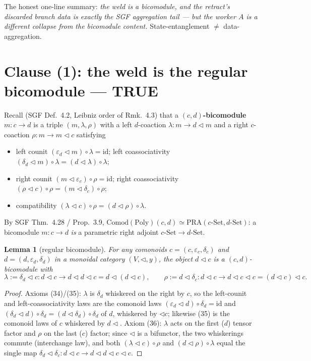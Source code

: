 \documentclass[11pt]{article}
\newtheorem{lemma}[theorem]{Lemma}
\theoremstyle{definition}
\newcommand{\Set}{\mathrm{Set}}
\newcommand{\Poly}{\mathrm{Poly}}
\newcommand{\Comod}{\mathrm{Comod}}
\newcommand{\PRA}{\mathrm{PRA}}
\newcommand{\id}{\mathrm{id}}
\newcommand{\comp}{\triangleleft}
\begin{document}
The honest one-line summary: \emph{the weld is a bicomodule, and the retract's discarded
branch data is exactly the SGF aggregation tail --- but the worker $A$ is a different
collapse from the bicomodule content.} State-entanglement $\neq$ data-aggregation.

\section{Clause (1): the weld is the regular bicomodule --- TRUE}\label{sec:clause1}

Recall (SGF Def.~4.2, Leibniz order of Rmk.~4.3) that a \textbf{$(c,d)$-bicomodule}
$m\colon c\to d$ is a triple $(m,\lambda,\rho)$ with a left $d$-coaction
$\lambda\colon m\to d\comp m$ and a right $c$-coaction $\rho\colon m\to m\comp c$ satisfying
\begin{itemize}
\item[(34)] left counit $(\varepsilon_{d}\comp m)\circ\lambda=\id$; left coassociativity
$(\delta_{d}\comp m)\circ\lambda=(d\comp\lambda)\circ\lambda$;
\item[(35)] right counit $(m\comp\varepsilon_{c})\circ\rho=\id$; right coassociativity
$(\rho\comp c)\circ\rho=(m\comp\delta_{c})\circ\rho$;
\item[(36)] compatibility $(\lambda\comp c)\circ\rho=(d\comp\rho)\circ\lambda$.
\end{itemize}
By SGF Thm.~4.28 / Prop.~3.9, $\Comod(\Poly)(c,d)\simeq\PRA(c\text{-}\Set,d\text{-}\Set)$:
a bicomodule $m\colon c\to d$ \emph{is} a parametric right adjoint $c\text{-}\Set\to d\text{-}\Set$.

\begin{lemma}[regular bicomodule]\label{thm:reg-lemma}
For any comonoids $c=(c,\varepsilon_{c},\delta_{c})$ and $d=(d,\varepsilon_{d},\delta_{d})$
in a monoidal category $(V,\comp,y)$, the object $d\comp c$ is a $(c,d)$-bicomodule with
\[
\lambda:=\delta_{d}\comp c\colon d\comp c\to d\comp d\comp c=d\comp(d\comp c),\qquad
\rho:=d\comp\delta_{c}\colon d\comp c\to d\comp c\comp c=(d\comp c)\comp c.
\]
\end{lemma}

\begin{proof}
Axioms (34)/(35): $\lambda$ is $\delta_{d}$ whiskered on the right by $c$, so the
left-counit and left-coassociativity laws are the comonoid laws
$(\varepsilon_{d}\comp d)\circ\delta_{d}=\id$ and
$(\delta_{d}\comp d)\circ\delta_{d}=(d\comp\delta_{d})\circ\delta_{d}$ of $d$, whiskered by
$\comp c$; likewise (35) is the comonoid laws of $c$ whiskered by $d\comp$. Axiom (36):
$\lambda$ acts on the first ($d$) tensor factor and $\rho$ on the last ($c$) factor; since
$\comp$ is a bifunctor, the two whiskerings commute (interchange law), and both
$(\lambda\comp c)\circ\rho$ and $(d\comp\rho)\circ\lambda$ equal the single map
$\delta_{d}\comp\delta_{c}\colon d\comp c\to d\comp d\comp c\comp c$.
\end{proof}
\end{document}
